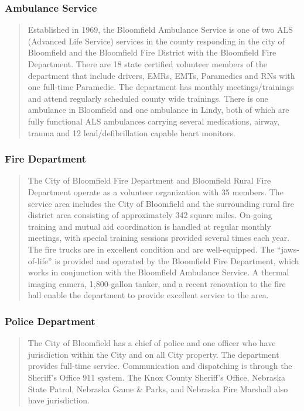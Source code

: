 \subsubsection*{Ambulance Service}

\begin{quote}
    Established in 1969, the Bloomfield Ambulance Service is one of two ALS (Advanced Life Service) services in the county responding in the city of Bloomfield and the Bloomfield Fire District with the Bloomfield Fire Department. There are 18 state certified volunteer members of the department that include drivers, EMRs, EMTs, Paramedics and RNs with one full-time Paramedic. The department has monthly meetings/trainings and attend regularly scheduled county wide trainings. There is one ambulance in Bloomfield and one ambulance in Lindy, both of which are fully functional ALS ambulances carrying several medications, airway, trauma and 12 lead/defibrillation capable heart monitors.
\end{quote}

\subsubsection*{Fire Department}

\begin{quote}
    The City of Bloomfield Fire Department and Bloomfield Rural Fire Department operate as a volunteer organization with 35 members. The service area includes the City of Bloomfield and the surrounding rural fire district area consisting of approximately 342 square miles. On-going training and mutual aid coordination is handled at regular monthly meetings, with special training sessions provided several times each year. The fire trucks are in excellent condition and are well-equipped. The “jaws-of-life” is provided and operated by the Bloomfield Fire Department, which works in conjunction with the Bloomfield Ambulance Service. A thermal imaging camera, 1,800-gallon tanker, and a recent renovation to the fire hall enable the department to provide excellent service to the area.
\end{quote}

\subsubsection*{Police Department}

\begin{quote}
    The City of Bloomfield has a chief of police and one officer who have jurisdiction within the City and on all City property. The department provides full-time service. Communication and dispatching is through the Sheriff’s Office 911 system. The Knox County Sheriff’s Office, Nebraska State Patrol, Nebraska Game \& Parks, and Nebraska Fire Marshall also have jurisdiction.
\end{quote}


